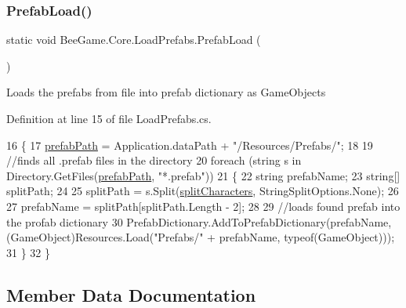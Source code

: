 \subsubsection{\texorpdfstring{Prefab\+Load()}{PrefabLoad()}}
{\footnotesize\ttfamily static void Bee\+Game.\+Core.\+Load\+Prefabs.\+Prefab\+Load (\begin{DoxyParamCaption}{ }\end{DoxyParamCaption})\hspace{0.3cm}{\ttfamily [static]}}



Loads the prefabs from file into prefab dictionary as Game\+Objects 



Definition at line 15 of file Load\+Prefabs.\+cs.


\begin{DoxyCode}
16         \{
17             \hyperlink{class_bee_game_1_1_core_1_1_load_prefabs_a0f61e1d478ea8953fc4cfa5fa4a59b90}{prefabPath} = Application.dataPath + \textcolor{stringliteral}{"/Resources/Prefabs/"};
18 
19             \textcolor{comment}{//finds all .prefab files in the directory}
20             \textcolor{keywordflow}{foreach} (\textcolor{keywordtype}{string} s \textcolor{keywordflow}{in} Directory.GetFiles(\hyperlink{class_bee_game_1_1_core_1_1_load_prefabs_a0f61e1d478ea8953fc4cfa5fa4a59b90}{prefabPath}, \textcolor{stringliteral}{"*.prefab"}))
21             \{
22                 \textcolor{keywordtype}{string} prefabName;
23                 \textcolor{keywordtype}{string}[] splitPath;
24 
25                 splitPath = s.Split(\hyperlink{class_bee_game_1_1_core_1_1_load_prefabs_a774463c4978def7fe0052c4ed1b46549}{splitCharacters}, StringSplitOptions.None);
26 
27                 prefabName = splitPath[splitPath.Length - 2];
28 
29                 \textcolor{comment}{//loads found prefab into the profab dictionary}
30                 PrefabDictionary.AddToPrefabDictionary(prefabName, (GameObject)Resources.Load(\textcolor{stringliteral}{"Prefabs/"} + 
      prefabName, typeof(GameObject)));
31             \}
32         \}
\end{DoxyCode}


\subsection{Member Data Documentation}
\mbox{\label{class_bee_game_1_1_core_1_1_load_prefabs_a0f61e1d478ea8953fc4cfa5fa4a59b90}} 
